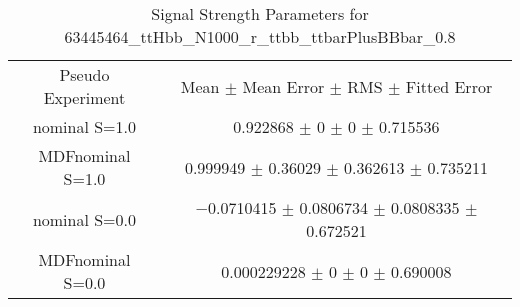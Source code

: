\begin{table}
\centering
\caption{Signal Strength Parameters for 63445464\_ttHbb\_N1000\_r\_ttbb\_ttbarPlusBBbar\_0.8}
\begin{tabular}{cc}
\toprule
Pseudo Experiment & Mean $\pm$ Mean Error $\pm$ RMS $\pm$ Fitted Error\\
nominal S=1.0 & \num{0.922868} $\pm$ \num{0} $\pm$ \num{0} $\pm$ \num{0.715536}\\
MDFnominal S=1.0 & \num{0.999949} $\pm$ \num{0.36029} $\pm$ \num{0.362613} $\pm$ \num{0.735211}\\
nominal S=0.0 & \num{-0.0710415} $\pm$ \num{0.0806734} $\pm$ \num{0.0808335} $\pm$ \num{0.672521}\\
MDFnominal S=0.0 & \num{0.000229228} $\pm$ \num{0} $\pm$ \num{0} $\pm$ \num{0.690008}\\
\bottomrule
\end{tabular}
\end{table}